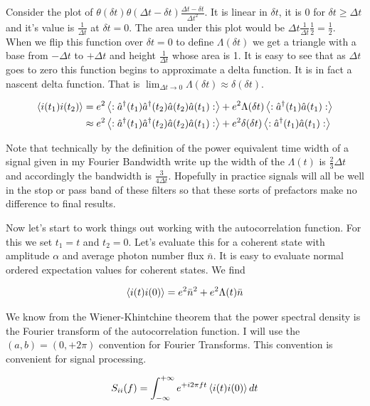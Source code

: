 \documentclass[12pt]{article}
\begin{document}
Consider the plot of $\theta(\delta t) \theta(\Delta t-\delta t)\frac{\Delta t-\delta t}{\Delta t^2}$. It is linear in $\delta t$, it is 0 for $\delta t \geq \Delta t$ and it's value is $\frac{1}{\Delta t}$ at $\delta t=0$. The area under this plot would be $\Delta t \frac{1}{\Delta t}\frac{1}{2} = \frac{1}{2}$. When we flip this function over $\delta t=0$ to define $\Lambda(\delta t)$ we get a triangle with a base from $-\Delta t$ to $+\Delta t$ and height $\frac{1}{\Delta t}$ whose area is 1. It is easy to see that as $\Delta t$ goes to zero this function begins to approximate a delta function. It is in fact a nascent delta function. That is $\lim_{\Delta t\rightarrow 0} \Lambda(\delta t) \approx \delta(\delta t)$.

\begin{align}
\braket{i(t_1)i(t_2)} &= e^2\left<:\hat{a}^{\dag}(t_1)\hat{a}^{\dag}(t_2)\hat{a}(t_2)\hat{a}(t_1):\right> + e^2 \Lambda(\delta t) \left<:\hat{a}^{\dag}(t_1)\hat{a}(t_1):\right>\\
&\approx e^2\left<:\hat{a}^{\dag}(t_1)\hat{a}^{\dag}(t_2)\hat{a}(t_2)\hat{a}(t_1):\right> + e^2 \delta(\delta t) \left<:\hat{a}^{\dag}(t_1)\hat{a}(t_1):\right>
\end{align}

Note that technically by the definition of the power equivalent time width of a signal given in my Fourier Bandwidth write up the width of the $\Lambda(t)$ is $\frac{2}{3}\Delta t$ and accordingly the bandwidth is $\frac{3}{4\Delta t}$. Hopefully in practice signals will all be well in the stop or pass band of these filters so that these sorts of prefactors make no difference to final results.

Now let's start to work things out working with the autocorrelation function. For this we set $t_1=t$ and $t_2=0$.
Let's evaluate this for a coherent state with amplitude $\alpha$ and average photon number flux $\bar{n}$. It is easy to evaluate normal ordered expectation values for coherent states. We find

\begin{align}
\braket{i(t)i(0)} = e^2 \bar{n}^2 + e^2 \Lambda(t) \bar{n}
\end{align}

We know from the Wiener-Khintchine theorem that the power spectral density is the Fourier transform of the autocorrelation function. I will use the $(a,b) = (0,+2\pi)$ convention for Fourier Transforms. This convention is convenient for signal processing.

\begin{equation}
S_{ii}(f) = \int_{-\infty}^{+\infty} e^{+i2 \pi f t} \braket{i(t)i(0)} dt 
\end{equation}
\end{document}
